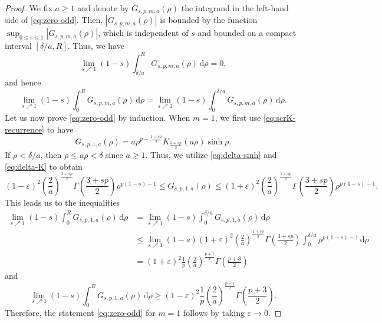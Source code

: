 \documentclass[11pt]{amsart}
\theoremstyle{plain}
\theoremstyle{definition}
\numberwithin{equation}{section}
\begin{document}
\begin{proof}
We fix $a \geq 1$ and denote by $G_{s, p, m, a}(\rho)$ the integrand in the left-hand side of \eqref{eq:zero-odd}. Then, $|G_{s, p, m, a}(\rho)|$ is bounded by the function $\sup_{0 \leq s \leq 1} |G_{s, p, m, a}(\rho)|$, which is independent of $s$ and bounded on a compact interval $[\delta/a, R]$. Thus, we have
\begin{equation*}
\lim_{s \nearrow 1} (1-s) \int_{\delta/a}^{R} G_{s, p, m, a}(\rho) \, \mathrm{d}\rho = 0,
\end{equation*}
and hence
\begin{equation*}
\lim_{s \nearrow 1} (1-s) \int_{0}^{R} G_{s, p, m, a}(\rho) \, \mathrm{d}\rho = \lim_{s \nearrow 1} (1-s) \int_{0}^{\delta/a} G_{s, p, m, a}(\rho) \, \mathrm{d}\rho.
\end{equation*}
Let us now prove \eqref{eq:zero-odd} by induction. When $m=1$, we first use \eqref{eq:scrK-recurrence} to have
\begin{equation*}
G_{s, p, 1, a}(\rho) = a\rho^{p-\frac{1+sp}{2}} K_{\frac{3+sp}{2}}(a\rho) \sinh \rho.
\end{equation*}
If $\rho < \delta/a$, then $\rho \leq a\rho < \delta$ since $a \geq 1$. Thus, we utilize \eqref{eq:delta-sinh} and \eqref{eq:delta-K} to obtain
\begin{equation*}
(1-\varepsilon)^2 \left( \frac{2}{a} \right)^{\frac{1+sp}{2}} \Gamma\left( \frac{3+sp}{2} \right) \rho^{p(1-s)-1} \leq G_{s, p, 1, a}(\rho) \leq (1+\varepsilon)^2 \left( \frac{2}{a} \right)^{\frac{1+sp}{2}} \Gamma\left( \frac{3+sp}{2} \right) \rho^{p(1-s)-1}.
\end{equation*}
This leads us to the inequalities
\begin{equation*}
\begin{split}
\lim_{s \nearrow 1} (1-s) \int_{0}^{R} G_{s, p, 1, a}(\rho) \, \mathrm{d}\rho
&= \lim_{s \nearrow 1} (1-s) \int_{0}^{\delta/a} G_{s, p, 1, a}(\rho) \, \mathrm{d}\rho \\
&\leq \lim_{s \nearrow 1} (1-s) (1+\varepsilon)^2 \left( \frac{2}{a} \right)^{\frac{1+sp}{2}} \Gamma\left( \frac{3+sp}{2} \right) \int_{0}^{\delta/a} \rho^{p(1-s)-1} \, \mathrm{d}\rho \\
&= (1+\varepsilon)^2 \frac{1}{p} \left( \frac{2}{a} \right)^{\frac{p+1}{2}} \Gamma\left( \frac{p+3}{2} \right)
\end{split}
\end{equation*}
and
\begin{equation*}
\lim_{s \nearrow 1} (1-s) \int_{0}^{R} G_{s, p, 1, a}(\rho) \, \mathrm{d}\rho \geq (1-\varepsilon)^{2} \frac{1}{p} \left( \frac{2}{a} \right)^{\frac{p+1}{2}} \Gamma\left( \frac{p+3}{2} \right).
\end{equation*}
Therefore, the statement \eqref{eq:zero-odd} for $m=1$ follows by taking $\varepsilon \to 0$.


\end{proof}
\end{document}
